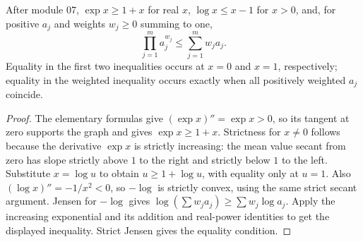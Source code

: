 \begin{proposition}
After module 07, $\exp x\ge1+x$ for real $x$, $\log x\le x-1$ for $x>0$, and, for positive $a_j$ and weights $w_j\ge0$ summing to one,
\[ \prod_{j=1}^m a_j^{w_j}\le\sum_{j=1}^m w_ja_j. \]
Equality in the first two inequalities occurs at $x=0$ and $x=1$, respectively; equality in the weighted inequality occurs exactly when all positively weighted $a_j$ coincide.
\end{proposition}
\begin{proof}
The elementary formulas give $(\exp x)''=\exp x>0$, so its tangent at zero supports the graph and gives $\exp x\ge1+x$. Strictness for $x\ne0$ follows because the derivative $\exp x$ is strictly increasing: the mean value secant from zero has slope strictly above $1$ to the right and strictly below $1$ to the left. Substitute $x=\log u$ to obtain $u\ge1+\log u$, with equality only at $u=1$. Also $(\log x)''=-1/x^2<0$, so $-\log$ is strictly convex, using the same strict secant argument. Jensen for $-\log$ gives $\log(\sum w_ja_j)\ge\sum w_j\log a_j$. Apply the increasing exponential and its addition and real-power identities to get the displayed inequality. Strict Jensen gives the equality condition.
\end{proof}
